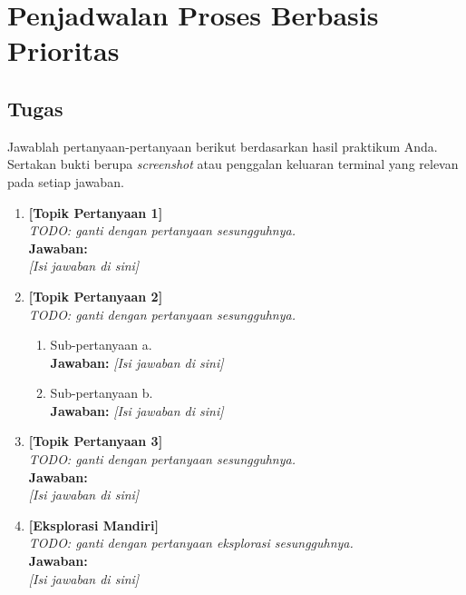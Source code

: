 
\chapter{Penjadwalan Proses Berbasis Prioritas}
\label{chap:handson-06}

\section{Tugas}

Jawablah pertanyaan-pertanyaan berikut berdasarkan hasil praktikum Anda.
Sertakan bukti berupa \textit{screenshot} atau penggalan keluaran terminal
yang relevan pada setiap jawaban.

\begin{enumerate}
    \item \textbf{[Topik Pertanyaan 1]}\\
    \textit{TODO: ganti dengan pertanyaan sesungguhnya.}\\[0.3cm]
    \textbf{Jawaban:}\\
    \textit{[Isi jawaban di sini]}

    \item \textbf{[Topik Pertanyaan 2]}\\
    \textit{TODO: ganti dengan pertanyaan sesungguhnya.}
    \begin{enumerate}
        \item[(a)] Sub-pertanyaan a.\\
        \textbf{Jawaban:} \textit{[Isi jawaban di sini]}
        \item[(b)] Sub-pertanyaan b.\\
        \textbf{Jawaban:} \textit{[Isi jawaban di sini]}
    \end{enumerate}

    \item \textbf{[Topik Pertanyaan 3]}\\
    \textit{TODO: ganti dengan pertanyaan sesungguhnya.}\\[0.3cm]
    \textbf{Jawaban:}\\
    \textit{[Isi jawaban di sini]}

    \item \textbf{[Eksplorasi Mandiri]}\\
    \textit{TODO: ganti dengan pertanyaan eksplorasi sesungguhnya.}\\[0.3cm]
    \textbf{Jawaban:}\\
    \textit{[Isi jawaban di sini]}
\end{enumerate}